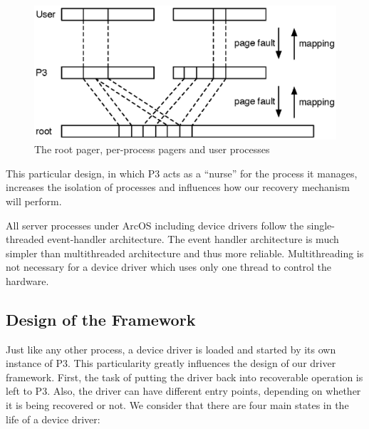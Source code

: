 \documentclass{report}
\begin{document}
\begin{figure}[ht]
\centering
\includegraphics[scale=0.6]{p3}
\caption{The root pager, per-process pagers and user processes}
\label{fig:p3}
\end{figure}

This particular design, in which P3 acts as a ``nurse'' for the process it manages, increases the isolation of processes and influences how our recovery mechanism will perform.

All server processes under ArcOS including device drivers follow the single-threaded event-handler architecture.  The event handler architecture is much simpler than multithreaded architecture\cite{ousterhout96why-threads} and thus more reliable.  Multithreading is not necessary for a device driver which uses only one thread to control the hardware.

\subsection{Design of the Framework}
\label{sec:design-framework}
Just like any other process, a device driver is loaded and started by its own instance of P3. This particularity greatly influences the design of our driver framework. First, the task of putting the driver back into recoverable operation is left to P3. Also, the driver can have different entry points, depending on whether it is being recovered or not. We consider that there are four main states in the life of a device driver:
\end{document}

